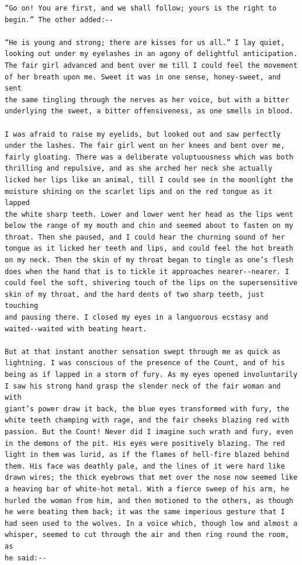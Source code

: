 \documentclass{article}
\begin{document}
\begin{verbatim}
“Go on! You are first, and we shall follow; yours is the right to
begin.” The other added:--

“He is young and strong; there are kisses for us all.” I lay quiet,
looking out under my eyelashes in an agony of delightful anticipation.
The fair girl advanced and bent over me till I could feel the movement
of her breath upon me. Sweet it was in one sense, honey-sweet, and sent
the same tingling through the nerves as her voice, but with a bitter
underlying the sweet, a bitter offensiveness, as one smells in blood.

I was afraid to raise my eyelids, but looked out and saw perfectly
under the lashes. The fair girl went on her knees and bent over me,
fairly gloating. There was a deliberate voluptuousness which was both
thrilling and repulsive, and as she arched her neck she actually
licked her lips like an animal, till I could see in the moonlight the
moisture shining on the scarlet lips and on the red tongue as it lapped
the white sharp teeth. Lower and lower went her head as the lips went
below the range of my mouth and chin and seemed about to fasten on my
throat. Then she paused, and I could hear the churning sound of her
tongue as it licked her teeth and lips, and could feel the hot breath
on my neck. Then the skin of my throat began to tingle as one’s flesh
does when the hand that is to tickle it approaches nearer--nearer. I
could feel the soft, shivering touch of the lips on the supersensitive
skin of my throat, and the hard dents of two sharp teeth, just touching
and pausing there. I closed my eyes in a languorous ecstasy and
waited--waited with beating heart.

But at that instant another sensation swept through me as quick as
lightning. I was conscious of the presence of the Count, and of his
being as if lapped in a storm of fury. As my eyes opened involuntarily
I saw his strong hand grasp the slender neck of the fair woman and with
giant’s power draw it back, the blue eyes transformed with fury, the
white teeth champing with rage, and the fair cheeks blazing red with
passion. But the Count! Never did I imagine such wrath and fury, even
in the demons of the pit. His eyes were positively blazing. The red
light in them was lurid, as if the flames of hell-fire blazed behind
them. His face was deathly pale, and the lines of it were hard like
drawn wires; the thick eyebrows that met over the nose now seemed like
a heaving bar of white-hot metal. With a fierce sweep of his arm, he
hurled the woman from him, and then motioned to the others, as though
he were beating them back; it was the same imperious gesture that I
had seen used to the wolves. In a voice which, though low and almost a
whisper, seemed to cut through the air and then ring round the room, as
he said:--


\end{verbatim}
\end{document}
